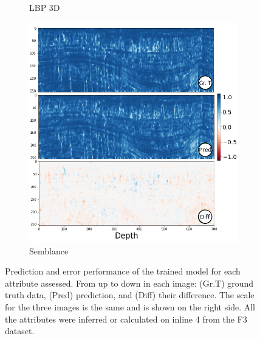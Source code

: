 \documentclass[conference]{IEEEtran}
\begin{document}
\begin{figure}[!t]
\begin{subfigure}[b]{\figattwidth\textwidth}
        \caption{LBP 3D}
        \label{fig:lbp3d}
     \end{subfigure}
     \begin{subfigure}[b]{\figattwidth\textwidth}
         \centering
        \includegraphics[width=1.03\columnwidth]{Fig/newFigs/semblance-half.png}
        \caption{Semblance}
        \label{fig:semblance}
     \end{subfigure}
     
        \caption{Prediction and error performance of the trained model for each attribute assessed. 
        From up to down in each image:  (Gr.T) ground truth data, (Pred) prediction, and (Diff) their difference. The scale for the three images is the same and is shown on the right side. All the attributes were inferred or calculated on inline 4 from the F3 dataset.}
        \label{fig:diferencas9}
\end{figure}
\def\figcompwidth{0.3293}
\end{document}
